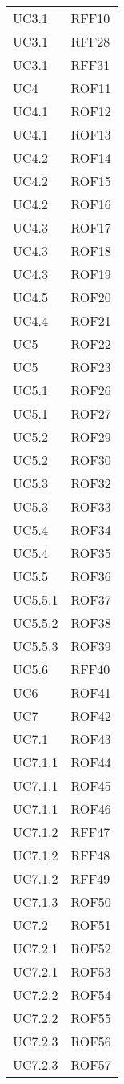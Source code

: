 \documentclass[../AnalisiDeiRequisiti_v4.0.0.tex]{subfiles}
\begin{document}
\begin{longtable}{p{4cm}!{\VRule[1pt]}p{4cm}}
UC3.1 & RFF10 \\
UC3.1 & RFF28 \\
UC3.1 & RFF31 \\
UC4 & ROF11 \\
UC4.1 & ROF12 \\
UC4.1 & ROF13 \\
UC4.2 & ROF14 \\
UC4.2 & ROF15 \\
UC4.2 & ROF16 \\
UC4.3 & ROF17 \\
UC4.3 & ROF18 \\
UC4.3 & ROF19 \\
UC4.5 & ROF20 \\
UC4.4 & ROF21 \\
UC5 & ROF22 \\
UC5 & ROF23 \\
UC5.1 & ROF26 \\
UC5.1 & ROF27 \\
UC5.2 & ROF29 \\
UC5.2 & ROF30 \\
UC5.3 & ROF32 \\
UC5.3 & ROF33 \\
UC5.4 & ROF34 \\
UC5.4 & ROF35 \\
UC5.5 & ROF36 \\
UC5.5.1 & ROF37 \\
UC5.5.2 & ROF38 \\
UC5.5.3 & ROF39 \\
UC5.6 & RFF40 \\
UC6 & ROF41 \\
UC7 & ROF42 \\
UC7.1 & ROF43 \\
UC7.1.1 & ROF44 \\
UC7.1.1 & ROF45 \\
UC7.1.1 & ROF46 \\
UC7.1.2 & RFF47 \\
UC7.1.2 & RFF48 \\
UC7.1.2 & RFF49 \\
UC7.1.3 & ROF50 \\
UC7.2 & ROF51 \\
UC7.2.1 & ROF52 \\
UC7.2.1 & ROF53 \\
UC7.2.2 & ROF54 \\
UC7.2.2 & ROF55 \\
UC7.2.3 & ROF56 \\
UC7.2.3 & ROF57 \\

\end{longtable}
\end{document}
